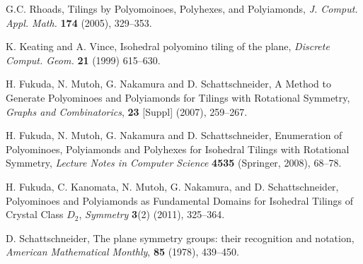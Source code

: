 \documentclass{ws-ijcga}
\begin{document}
\begin{thebibliography}{0}
G.C. Rhoads, 
Tilings by Polyomoinoes, Polyhexes, and Polyiamonds,
{\it J. Comput. Appl. Math.} {\bf 174} (2005), 329--353.

K. Keating and A. Vince,
Isohedral polyomino tiling of the plane,
{\it Discrete Comput. Geom.} {\bf 21} (1999) 615--630.

H. Fukuda, N. Mutoh, G. Nakamura and D. Schattschneider,
A Method to Generate Polyominoes and
Polyiamonds for Tilings with Rotational Symmetry,
{\it Graphs and Combinatorics}, 
{\bf 23} [Suppl] (2007), 259--267.

H. Fukuda, N. Mutoh, G. Nakamura and D. Schattschneider,
Enumeration of Polyominoes, Polyiamonds and Polyhexes for 
Isohedral Tilings with Rotational Symmetry,
{\it Lecture Notes in Computer Science} {\bf 4535} (Springer, 2008), 68--78.

H. Fukuda, C. Kanomata, N. Mutoh, G. Nakamura, and D. Schattschneider, 
Polyominoes and Polyiamonds as Fundamental Domains for Isohedral Tilings of Crystal Class $D_2$, 
{\it Symmetry} {\bf 3}(2) (2011), 325--364.


D. Schattschneider,
The plane symmetry groups:
their recognition and notation,
{\it American Mathematical Monthly}, {\bf 85} (1978), 439--450.

\end{thebibliography}
\end{document}
